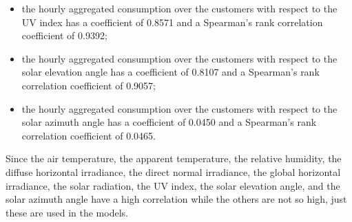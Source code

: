 \begin{itemize}
  \item the hourly aggregated consumption over the customers with respect to the UV index has a coefficient of 0.8571 and a Spearman's rank correlation coefficient of 0.9392;
  \item the hourly aggregated consumption over the customers with respect to the solar elevation angle has a coefficient of 0.8107 and a Spearman's rank correlation coefficient of 0.9057;
  \item the hourly aggregated consumption over the customers with respect to the solar azimuth angle has a coefficient of 0.0450 and a Spearman's rank correlation coefficient of 0.0465.
\end{itemize}
Since the air temperature, the apparent temperature, the relative humidity, the diffuse horizontal irradiance, the direct normal irradiance, the global horizontal irradiance, the solar radiation, the UV index, the solar elevation angle, and the solar azimuth angle have a high correlation while the others are not so high, just these are used in the models.  %

